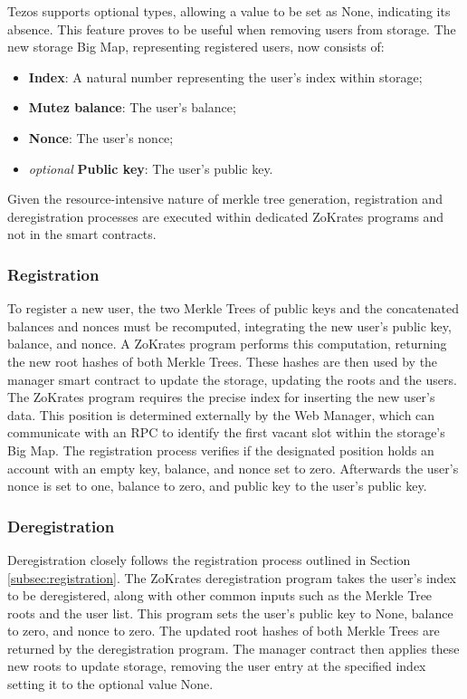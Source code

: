 Tezos supports optional types, allowing a value to be set as None, indicating its absence. This feature proves to be useful when removing users from storage. The new storage Big Map, representing registered users, now consists of:
\begin{itemize}
	\item \textbf{Index}: A natural number representing the user's index within storage;
	\item \textbf{Mutez balance}: The user's balance;
	\item \textbf{Nonce}: The user's nonce;
	\item \textit{optional} \textbf{Public key}: The user's public key.
\end{itemize}

Given the resource-intensive nature of merkle tree generation, registration and deregistration processes are executed within dedicated ZoKrates programs and not in the smart contracts.

\subsubsection{Registration\label{subsec:registration}}

To register a new user, the two Merkle Trees of public keys and the concatenated balances and nonces must be recomputed, integrating the new user's public key, balance, and nonce. A ZoKrates program performs this computation, returning the new root hashes of both Merkle Trees. These hashes are then used by the manager smart contract to update the storage, updating the roots and the users. The ZoKrates program requires the precise index for inserting the new user's data. This position is determined externally by the Web Manager, which can communicate with an RPC to identify the first vacant slot within the storage's Big Map. The registration process verifies if the designated position holds an account with an empty key, balance, and nonce set to zero. Afterwards the user's nonce is set to one, balance to zero, and public key to the user's public key.

\subsubsection{Deregistration}

Deregistration closely follows the registration process outlined in Section \ref{subsec:registration}. The ZoKrates deregistration program takes the user's index to be deregistered, along with other common inputs such as the Merkle Tree roots and the user list. This program sets the user's public key to None, balance to zero, and nonce to zero. The updated root hashes of both Merkle Trees are returned by the deregistration program. The manager contract then applies these new roots to update storage, removing the user entry at the specified index setting it to the optional value None.

